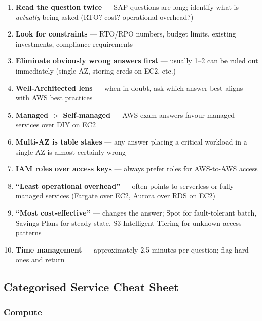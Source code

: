 \begin{examtip}[title={[!] SAP-C02 Exam Tips}]
\begin{enumerate}
  \item \textbf{Read the question twice} --- SAP questions are long; identify what is \emph{actually} being asked (RTO? cost? operational overhead?)
  \item \textbf{Look for constraints} --- RTO/RPO numbers, budget limits, existing investments, compliance requirements
  \item \textbf{Eliminate obviously wrong answers first} --- usually 1--2 can be ruled out immediately (single AZ, storing creds on EC2, etc.)
  \item \textbf{Well-Architected lens} --- when in doubt, ask which answer best aligns with AWS best practices
  \item \textbf{Managed $>$ Self-managed} --- AWS exam answers favour managed services over DIY on EC2
  \item \textbf{Multi-AZ is table stakes} --- any answer placing a critical workload in a single AZ is almost certainly wrong
  \item \textbf{IAM roles over access keys} --- always prefer roles for AWS-to-AWS access
  \item \textbf{``Least operational overhead''} --- often points to serverless or fully managed services (Fargate over EC2, Aurora over RDS on EC2)
  \item \textbf{``Most cost-effective''} --- changes the answer; Spot for fault-tolerant batch, Savings Plans for steady-state, S3 Intelligent-Tiering for unknown access patterns
  \item \textbf{Time management} --- approximately 2.5 minutes per question; flag hard ones and return
\end{enumerate}
\end{examtip}

\subsection{Categorised Service Cheat Sheet}

\subsubsection{Compute}


